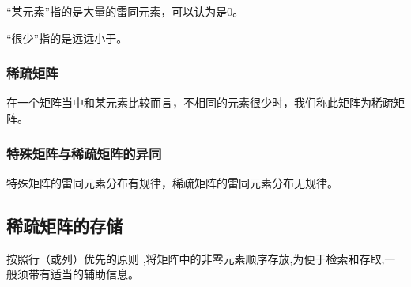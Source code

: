\documentclass[AutoFakeBold]{LZUThesis2007}
\begin{document}
“某元素”指的是大量的雷同元素，可以认为是0。
		
“很少”指的是远远小于。

			\subsubsection{稀疏矩阵}
在一个矩阵当中和某元素比较而言，不相同的元素很少时，我们称此矩阵为稀疏矩阵。
			\subsubsection{特殊矩阵与稀疏矩阵的异同}
特殊矩阵的雷同元素分布有规律，稀疏矩阵的雷同元素分布无规律。

		\subsection{稀疏矩阵的存储}
按照行（或列）优先的原则 ,将矩阵中的非零元素顺序存放,为便于检索和存取,一般须带有适当的辅助信息。
\end{document}

